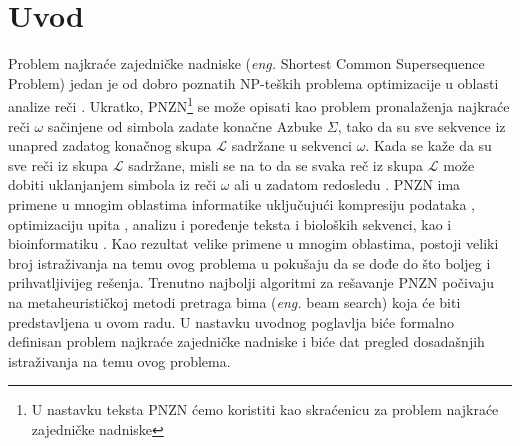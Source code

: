 \documentclass[12pt,oneside]{memoir}
\begin{document}
\frontmatter
\naslovna
\komisija
\apstrakt
\tableofcontents*

\mainmatter

\chapter{Uvod}
\label{chap:uvod}
Problem najkraće zajedničke nadniske (\textit{eng.} Shortest Common Supersequence Problem)
jedan je od dobro poznatih NP-teških problema optimizacije u oblasti analize reči \cite{ProbabilisticBS}.
Ukratko, PNZN\footnote{U nastavku teksta PNZN ćemo koristiti kao skraćenicu za problem najkraće zajedničke nadniske}
se može opisati kao problem pronalaženja najkraće reči $\omega$ sačinjene
od simbola zadate konačne Azbuke $\Sigma$, tako da su sve sekvence iz unapred zadatog konačnog skupa
$\mathcal{L}$ sadržane u sekvenci $\omega$. Kada se kaže da su sve reči iz skupa $\mathcal{L}$
sadržane, misli se na to da se svaka reč iz skupa $\mathcal{L}$ može dobiti uklanjanjem simbola iz reči $\omega$ ali 
u zadatom redosledu \cite{SCSSProblemDef}. PNZN ima primene u mnogim oblastima informatike uključujući kompresiju podataka
\cite{DataCompression}, optimizaciju upita \cite{MQOptimization}, analizu i poređenje teksta i bioloških sekvenci, \cite{ITAlgorithms} \cite{SeqComparison}
kao i bioinformatiku \cite{ProbabilisticBS}.
Kao rezultat velike primene u mnogim oblastima, postoji veliki broj istraživanja na temu ovog problema u pokušaju da se dođe
do što boljeg i prihvatljivijeg rešenja. Trenutno najbolji algoritmi za rešavanje PNZN počivaju na metaheurističkoj metodi
pretraga bima (\textit{eng.} beam search) koja će biti predstavljena u ovom radu. U nastavku uvodnog poglavlja biće formalno
definisan problem najkraće zajedničke nadniske i biće dat pregled dosadašnjih istraživanja na temu ovog problema.
\end{document}

